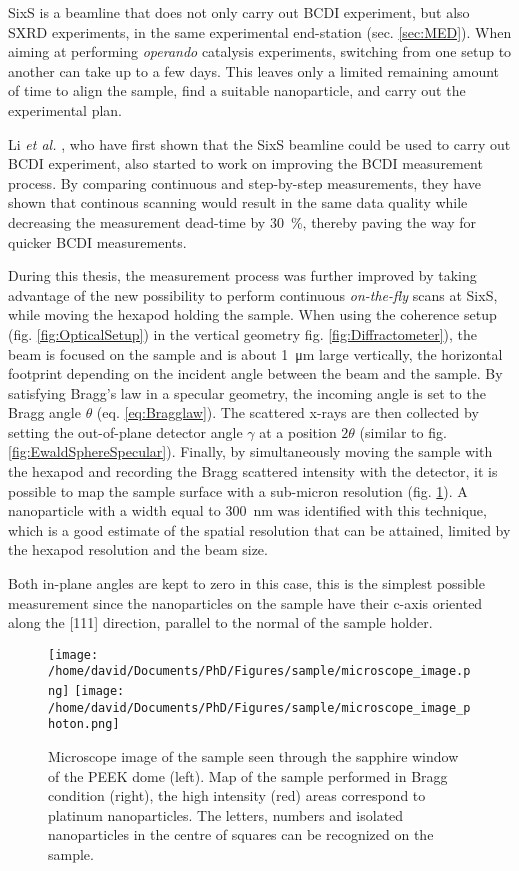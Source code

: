 SixS is a beamline that does not only carry out BCDI experiment, but also SXRD experiments, in the same experimental end-station (sec. \ref{sec:MED}).
When aiming at performing \textit{operando} catalysis experiments, switching from one setup to another can take up to a few days.
This leaves only a limited remaining amount of time to align the sample, find a suitable nanoparticle, and carry out the experimental plan.

Li \textit{et al.} \parencite*{Li2020}, who have first shown that the SixS beamline could be used to carry out BCDI experiment, also started to work on improving the BCDI measurement process.
By comparing continuous and step-by-step measurements, they have shown that continous scanning would result in the same data quality while decreasing the measurement dead-time by \qty{30}{\percent}, thereby paving the way for quicker BCDI measurements.

During this thesis, the measurement process was further improved by taking advantage of the new possibility to perform continuous \textit{on-the-fly} scans at SixS, while moving the hexapod holding the sample.
When using the coherence setup (fig. \ref{fig:OpticalSetup}) in the vertical geometry fig. \ref{fig:Diffractometer}), the beam is focused on the sample and is about \qty{1}{\um} large vertically, the horizontal footprint depending on the incident angle between the beam and the sample.
By satisfying Bragg's law in a specular geometry, the incoming angle is set to the Bragg angle $\theta$ (eq. \ref{eq:Bragglaw}).
The scattered x-rays are then collected by setting the out-of-plane detector angle $\gamma$ at a position $2\theta$ (similar to fig. \ref{fig:EwaldSphereSpecular}).
Finally, by simultaneously moving the sample with the hexapod and recording the Bragg scattered intensity with the detector, it is possible to map the sample surface with a sub-micron resolution (fig. \ref{fig:SampleMapping}).
A nanoparticle with a width equal to \qty{300}{\nm} was identified with this technique, which is a good estimate of the spatial resolution that can be attained, limited by the hexapod resolution and the beam size.

Both in-plane angles are kept to zero in this case, this is the simplest possible measurement since the nanoparticles on the sample have their c-axis oriented along the [111] direction, parallel to the normal of the sample holder.

\begin{figure}[!htb]
    \centering
    \texttt{[image: /home/david/Documents/PhD/Figures/sample/microscope\_image.png]}
    \texttt{[image: /home/david/Documents/PhD/Figures/sample/microscope\_image\_photon.png]}
    \caption{
        Microscope image of the sample seen through the sapphire window of the PEEK dome (left).
        Map of the sample performed in Bragg condition (right), the high intensity (red) areas correspond to platinum nanoparticles.
        The letters, numbers and isolated nanoparticles in the centre of squares can be recognized on the sample.
    }
    \label{fig:SampleMapping}
\end{figure}

